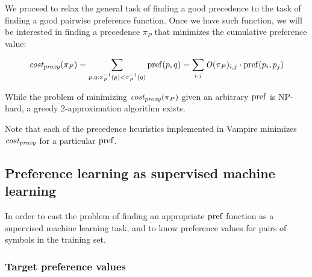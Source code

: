 We proceed to relax the general task of finding a good precedence
to the task of finding a good pairwise preference function.
Once we have such function,
we will be interested in finding a precedence \(\pi_P\) that minimizes the cumulative preference value:

\begin{align*}
\operatorname{\mathit{cost_{proxy}}}(\pi_P) = \sum_{p, q: \pi_P^{-1}(p) < \pi_P^{-1}(q)} \operatorname{pref}(p, q)
= \sum_{i, j} \operatorname{\mathit{O}}(\pi_P)_{i, j} \cdot \operatorname{pref}(p_i, p_j)
\end{align*}

While the problem of minimizing \(\operatorname{\mathit{cost_{proxy}}}(\pi_P)\) given an arbitrary \(\operatorname{pref}\) is NP-hard,
a greedy 2-approximation algorithm exists.\cite{Cohen2011}

Note that each of the precedence heuristics implemented in Vampire minimizes \(\operatorname{\mathit{cost_{proxy}}}\)
for a particular \(\operatorname{pref}\).

\subsection{Preference learning as supervised machine learning}

In order to cast the problem of finding an appropriate \(\operatorname{pref}\) function
as a supervised machine learning task,
and to know preference values for pairs of symbols in the training set.

\subsubsection{Target preference values}
\label{sec:target-preference-values}

